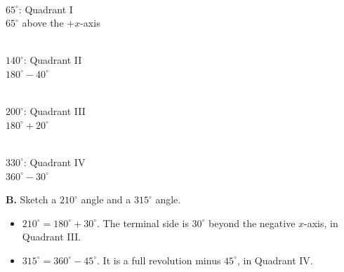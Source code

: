 \noindent
\begin{minipage}[t]{0.24\textwidth}\centering
{}\\[-2pt]
{\small $65^\circ$: Quadrant I\\ $65^\circ$ above the $+x$-axis}
\end{minipage}\hfill
\begin{minipage}[t]{0.24\textwidth}\centering
{}\\[-2pt]
{\small $140^\circ$: Quadrant II\\ $180^\circ-40^\circ$}
\end{minipage}\hfill
\begin{minipage}[t]{0.24\textwidth}\centering
{}\\[-2pt]
{\small $200^\circ$: Quadrant III\\ $180^\circ+20^\circ$}
\end{minipage}\hfill
\begin{minipage}[t]{0.24\textwidth}\centering
{}\\[-2pt]
{\small $330^\circ$: Quadrant IV\\ $360^\circ-30^\circ$}
\end{minipage}

\vspace{4pt}
\begin{minipage}[t]{0.5\textwidth}
\textbf{B.} Sketch a $210^\circ$ angle and a $315^\circ$ angle.
\begin{itemize}
\item $210^\circ=180^\circ+30^\circ$. The terminal side is $30^\circ$ beyond the negative $x$-axis, in Quadrant III.
\item $315^\circ=360^\circ-45^\circ$. It is a full revolution minus $45^\circ$, in Quadrant IV.
\end{itemize}
\end{minipage}\hfill
\begin{minipage}[t]{0.23\textwidth}\centering\vspace{0pt}
\end{minipage}\hfill
\begin{minipage}[t]{0.23\textwidth}\centering\vspace{0pt}
\end{minipage}

